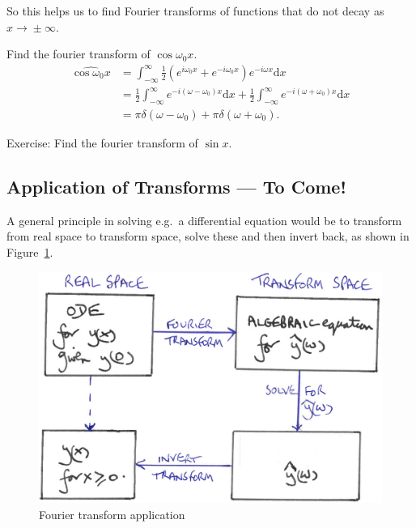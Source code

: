 \documentclass[12pt]{report}
\theoremstyle{definition}
\begin{document}
So this helps us to find Fourier transforms of functions that do not decay as $x\rightarrow{}\pm\infty$.

\begin{ex}
    Find the fourier transform of $\cos{\omega_0x}$.
    \begin{align*}
        \widehat{\cos{\omega_0x}}
        & = \int_{-\infty}^{\infty} \frac{1}{2}(e^{i\omega_0x}+e^{-i\omega_0x})e^{-i\omega x}\mathrm{d}x \\
        & = \frac{1}{2}\int_{-\infty}^{\infty} e^{-i(\omega-\omega_0)x}\mathrm{d}x
        + \frac{1}{2}\int_{-\infty}^{\infty} e^{-i(\omega+\omega_0)x}\mathrm{d}x \\
        & = \pi\delta(\omega-\omega_0) + \pi\delta(\omega+\omega_0).
    \end{align*}
\end{ex} 

\noindent Exercise: Find the fourier transform of $\sin{x}$.

\subsection{Application of Transforms --- To Come!}

A general principle in solving e.g.\ a differential equation would be to
transform from real space to transform space, solve these and then invert back,
as shown in Figure~\ref{fig:transformApp}.

\begin{figure}
  	\includegraphics[scale=0.15]{transformApp.jpeg}
  	\centering
    \caption{Fourier transform application}\label{fig:transformApp}
\end{figure}
\end{document}
